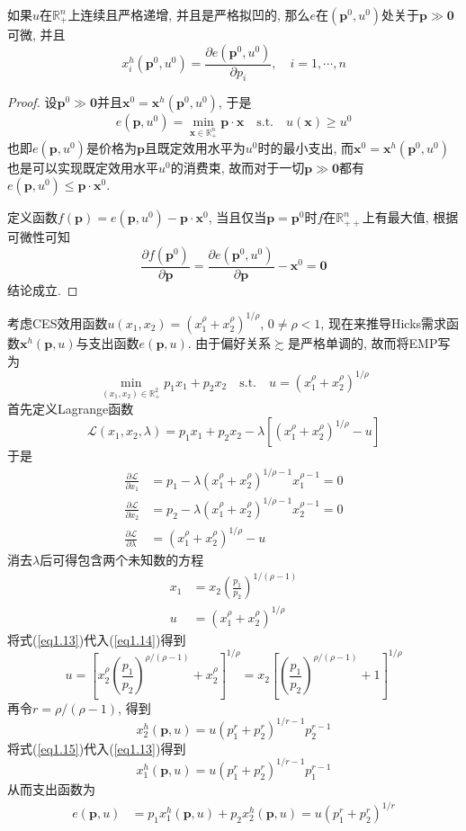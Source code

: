 \documentclass[cn, 12pt, math=mtpro2, bibstyle=apa, blue]{elegantbook}
\newcommand{\R}{\mathbb{R}}
\newcommand{\p}{\mathbf{p}}
\newcommand{\x}{\mathbf{x}}
\begin{document}
\begin{theorem}[Shephard引理]
  如果$u$在$\R_+^n$上连续且严格递增, 并且是严格拟凹的, 那么$e$在$(\p^0,u^0)$处关于$\p\gg\mathbf{0}$可微, 并且
  $$x_i^h(\p^0,u^0)=\frac{\partial e(\p^0,u^0)}{\partial p_i},\quad i=1,\cdots,n$$
\end{theorem}
\begin{proof}
  设$\p^0\gg\mathbf{0}$并且$\x^0=\x^h(\p^0,u^0)$, 于是
  $$e(\p,u^0)=\min_{\x\in\R_+^n}\p\cdot\x\quad\text{s.t.}\quad u(\x)\ge u^0$$
  也即$e(\p,u^0)$是价格为$\p$且既定效用水平为$u^0$时的最小支出, 而$\x^0=\x^h(\p^0,u^0)$也是可以实现既定效用水平$u^0$的消费束, 故而对于一切$\p\gg\mathbf{0}$都有$e(\p,u^0)\leq \p\cdot\x^0$.

  定义函数$f(\p)=e(\p,u^0)-\p\cdot\x^0$, 当且仅当$\p=\p^0$时$f$在$\R_{++}^n$上有最大值, 根据可微性可知
  $$\frac{\partial f(\p^0)}{\partial \p}=\frac{\partial e(\p^0,u^0)}{\partial \p}-\x^0=\mathbf{0}$$
  结论成立.
\end{proof}
\begin{example}
考虑CES效用函数$u(x_1,x_2)=(x_1^\rho+x_2^\rho)^{1/\rho}$, $0\neq\rho<1$, 现在来推导Hicks需求函数$\x^h(\p,u)$与支出函数$e(\p,u)$. 由于偏好关系$\succsim$是严格单调的, 故而将EMP写为
$$\min_{(x_1,x_2)\in\R_+^2}p_1x_1+p_2x_2\quad\text{s.t.}\quad u=(x_1^\rho+x_2^\rho)^{1/\rho}$$
首先定义Lagrange函数
$$\mathcal{L}(x_1,x_2,\lambda)=p_1x_1+p_2x_2-\lambda[(x_1^\rho+x_2^\rho)^{1/\rho}-u]$$
于是
\begin{align*}
\frac{\partial\mathcal{L}}{\partial x_1}&=p_1-\lambda(x_1^\rho+x_2^\rho)^{1/\rho-1}x_1^{\rho-1}=0 \\
\frac{\partial\mathcal{L}}{\partial x_2}&=p_2-\lambda(x_1^\rho+x_2^\rho)^{1/\rho-1}x_2^{\rho-1}=0 \\
\frac{\partial\mathcal{L}}{\partial\lambda}&=(x_1^\rho+x_2^\rho)^{1/\rho}-u
\end{align*}
消去$\lambda$后可得包含两个未知数的方程
\begin{align}
x_1&=x_2\left(\frac{p_1}{p_2}\right)^{1/(\rho-1)} \label{eq1.13} \\
u&=(x_1^\rho+x_2^\rho)^{1/\rho} \label{eq1.14}
\end{align}
将式(\ref{eq1.13})代入(\ref{eq1.14})得到
$$  u=\left[x_2^\rho\left(\frac{p_1}{p_2}\right)^{\rho/(\rho-1)}+x_2^\rho\right]^{1/\rho}=x_2\left[\left(\frac{p_1}{p_2}\right)^{\rho/(\rho-1)}+1\right]^{1/\rho}
$$
再令$r=\rho/(\rho-1)$, 得到
\begin{equation}\label{eq1.15}
  x_2^h(\p,u)=u(p_1^r+p_2^r)^{1/r-1}p_2^{r-1}
\end{equation}
将式(\ref{eq1.15})代入(\ref{eq1.13})得到
$$  x_1^h(\p,u)=u(p_1^r+p_2^r)^{1/r-1}p_1^{r-1}
$$
从而支出函数为
\begin{align*}
e(\p,u)&=p_1x_1^h(\p,u)+p_2x_2^h(\p,u)=u(p_1^r+p_2^r)^{1/r}
\end{align*}
\end{example}
\end{document}
